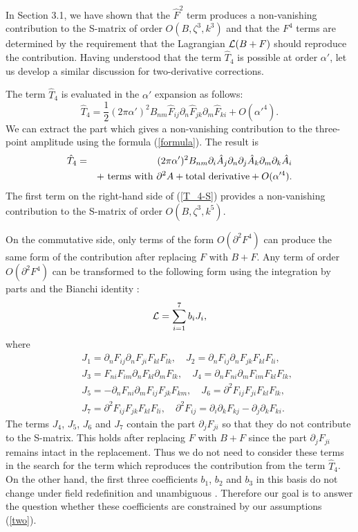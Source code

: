 \documentclass[a4paper,12pt]{article}
\begin{document}
In Section 3.1, we have shown that the $\hat{F}^2$ term
produces a non-vanishing contribution to the S-matrix
of order $O(B, \zeta^3, k^3)$ and that the $F^4$ terms are
determined by the requirement that
the Lagrangian ${\cal L} (B+F)$ should
reproduce the contribution.
Having understood that the term $\hat{T}_4$
is possible at order $\alpha'$, let us develop a similar discussion
for two-derivative corrections.

The term $\hat{T}_4$ is evaluated
in the $\alpha'$ expansion as follows:
\begin{equation}
\hat{T}_4 = \frac{1}{2} (2 \pi \alpha')^2 B_{nm}
\hat{F}_{ij} \partial_n \hat{F}_{jk} \partial_m \hat{F}_{ki}
+ O(\alpha'^4).
\label{T_4-expansion}
\end{equation}
We can extract the part which gives a non-vanishing contribution
to the three-point amplitude using the formula (\ref{formula}).
The result is
\begin{eqnarray}
\hat{T}_4 &=& (2 \pi \alpha')^2 B_{nm} \partial_i \hat{A}_j
\partial_n \partial_j \hat{A}_k \partial_m \partial_k \hat{A}_i
\nonumber \\
&& + {\rm ~terms~with~} \partial^2 A
+ {\rm total~derivative}
+ O(\alpha'^4).
\label{T_4-S}
\end{eqnarray}
The first term on the right-hand side of (\ref{T_4-S})
provides a non-vanishing contribution to the S-matrix
of order $O(B, \zeta^3, k^5)$.

On the commutative side, only terms of the form $O(\partial^2 F^4)$
can produce the same form of the contribution
after replacing $F$ with $B+F$.
Any term of order $O(\partial^2 F^4)$ can be
transformed to the following form
using the integration by parts
and the Bianchi identity \cite{AT1}:
\begin{equation}
{\cal L} = \sum_{i=1}^{7} b_i J_i,
\end{equation}
where
\begin{eqnarray}
&& J_1 = \partial_n F_{ij} \partial_n F_{ji} F_{kl} F_{lk},
\quad
J_2 = \partial_n F_{ij} \partial_n F_{jk} F_{kl} F_{li},
\nonumber \\
&& J_3 = F_{ni} F_{im} \partial_n F_{kl} \partial_m F_{lk},
\quad
J_4 = \partial_n F_{ni} \partial_m F_{im} F_{kl} F_{lk},
\nonumber \\
&& J_5 = -\partial_n F_{ni} \partial_m F_{ij} F_{jk} F_{km},
\quad
J_6 = \partial^2 F_{ij} F_{ji} F_{kl} F_{lk},
\nonumber \\
&& J_7 = \partial^2 F_{ij} F_{jk} F_{kl} F_{li},
\quad
\partial^2 F_{ij}
= \partial_i \partial_k F_{kj} - \partial_j \partial_k F_{ki}.
\label{AT}
\end{eqnarray}
The terms $J_4$, $J_5$, $J_6$ and $J_7$ contain the part
$\partial_j F_{ji}$ so that they do not contribute to the S-matrix.
This holds after replacing $F$ with $B+F$
since the part $\partial_j F_{ji}$ remains intact
in the replacement.
Thus we do not need to consider these terms
in the search for the term which reproduces the contribution from
the term $\hat{T}_4$.
On the other hand,
the first three coefficients $b_1$, $b_2$ and $b_3$
in this basis do not change
under field redefinition and unambiguous \cite{AT2}.
Therefore our goal is to answer the question whether
these coefficients are constrained by our assumptions (\ref{two}).
\end{document}
